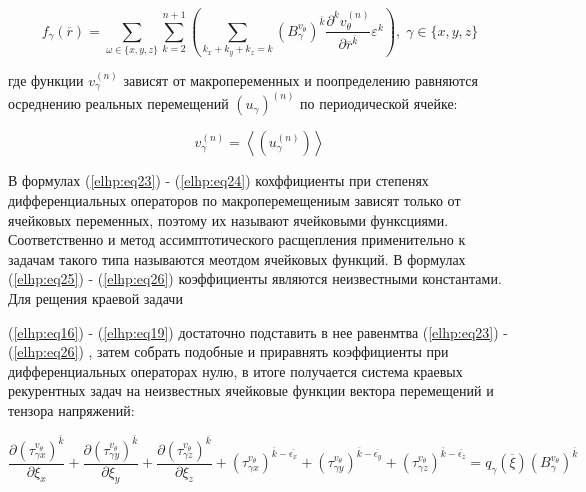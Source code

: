 \begin{equation}
    \label{elhp:eq26}
    f_{ \gamma} \left( \overline{r}  \right) =
    \sum_{ \omega \in \{x,y,z\} } \sum_{k=2}^{n+1}
    \left( 
    \sum_{k_x+k_y+k_z = k} 
    \left( B_{\gamma}^{v_{\theta}} \right)^{ \overline{k} } 
    \frac{\partial^k v_{\theta}^{(n)}}{\partial \overline{r}^{ \overline{k}  } } 
    \varepsilon^k
\right) 
,\;
\gamma \in \{x,y,z\} 
\end{equation}


где функции 
$v_{ \gamma}^{(n)}$ 
зависят от макропеременных и поопределению равняются осреднению реальных перемещений 
$ \left(  u_{ \gamma} \right)^{(n)} $ 
по периодической ячейке:

\begin{equation}
    \label{elhp:eq27}
    v_{ \gamma}^{(n)} = \left< \left( u_{ \gamma}^{(n)} \right)  \right> 
\end{equation}

В формулах 
(\ref{elhp:eq23})
-
(\ref{elhp:eq24})
кохффициенты при степенях дифференциальных операторов по макроперемещениым зависят только от ячейковых переменных, 
поэтому их называют ячейковыми функсциями. Соответственно и метод ассимптотического расщепления применительно к задачам такого типа
называются меотдом ячейковых функций. В формулах 
(\ref{elhp:eq25})
-
(\ref{elhp:eq26})
коэффициенты являются неизвестными константами. Для рещения краевой задачи

(\ref{elhp:eq16})
-
(\ref{elhp:eq19})
достаточно подставить в нее равенмтва 
(\ref{elhp:eq23})
-
(\ref{elhp:eq26})
, затем собрать подобные и приравнять коэффициенты при дифференциальных операторах 
нулю, в итоге получается система краевых рекурентных задач на неизвестных ячейковые функции вектора перемещений и тензора напряжений:

\begin{equation}
    \label{elhp:eq28}
    \frac{\partial \left(  \tau_{ \gamma x}^{v_{\theta}}\right)^{ \overline{k} }}{\partial \xi_x} +
    \frac{\partial \left(  \tau_{ \gamma y}^{v_{\theta}}\right)^{ \overline{k} }}{\partial \xi_y} +
    \frac{\partial \left(  \tau_{ \gamma z}^{v_{\theta}}\right)^{ \overline{k} }}{\partial \xi_z} +
    \left(  \tau_{ \gamma x}^{v_{\theta}}\right)^{ \overline{k} - \overline{\epsilon_x} } +
    \left(  \tau_{ \gamma y}^{v_{\theta}}\right)^{ \overline{k} - \overline{\epsilon_y} } +
    \left(  \tau_{ \gamma z}^{v_{\theta}}\right)^{ \overline{k} - \overline{\epsilon_z} } =
    q_{\gamma} \left( \overline{\xi}  \right) \left( B_{\gamma}^{v_{\theta}} \right)^{ \overline{k} }
\end{equation}

